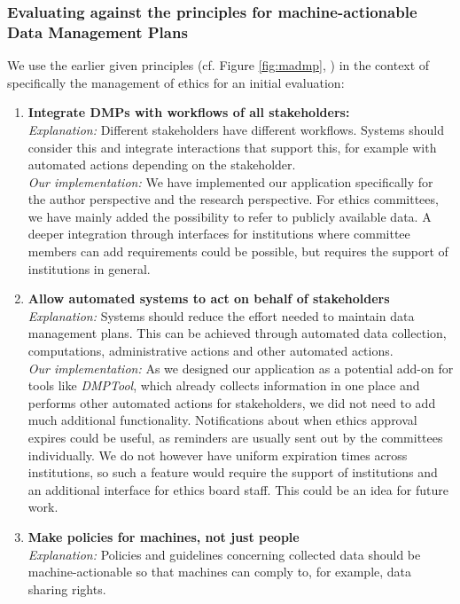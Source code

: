 \documentclass[10pt]{article}
\begin{document}
\subsubsection{Evaluating against the principles for machine-actionable Data Management Plans}
We use the earlier given principles (cf. Figure \ref{fig:madmp}, \cite{madmp}) in the context of specifically the management of ethics for an initial evaluation:
\begin{enumerate}
\item \textbf{Integrate DMPs with workflows of all stakeholders:} \\
\textit{Explanation:} Different stakeholders have different workflows. Systems should consider this and integrate interactions that support this, for example with automated actions depending on the stakeholder.  \\
\textit{Our implementation:} We have implemented our application specifically for the author perspective and the research perspective. For ethics committees, we have mainly added the possibility to refer to publicly available data. A deeper integration through interfaces for institutions where committee members can add requirements could be possible, but requires the support of institutions in general.
\item \textbf{Allow automated systems to act on behalf of stakeholders} \\
\textit{Explanation:} Systems should reduce the effort needed to maintain data management plans. This can be achieved through automated data collection, computations, administrative actions and other automated actions.\\
\textit{Our implementation:} As we designed our application as a potential add-on for tools like \textit{DMPTool}, which already collects information in one place and performs other automated actions for stakeholders, we did not need to add much additional functionality. Notifications about when ethics approval expires could be useful, as reminders are usually sent out by the committees individually. We do not however have uniform expiration times across institutions, so such a feature would require the support of institutions and an additional interface for ethics board staff. This could be an idea for future work.
\item \textbf{Make policies for machines, not just people} \\
\textit{Explanation:}  Policies and guidelines concerning collected data should be machine-actionable so that machines can comply to, for example, data sharing rights.  \\

\end{enumerate}
\end{document}
